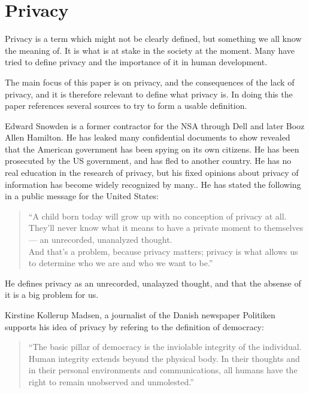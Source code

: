 \section{Privacy}
Privacy is a term which might not be clearly defined, but something we all know the meaning of. It is what is at stake in the society at the moment. Many have tried to define privacy and the importance of it in human development.

The main focus of this paper is on privacy, and the consequences of the lack of privacy, and it is therefore relevant to define what privacy is. In doing this the paper references several sources to try to form a usable definition.

Edward Snowden is a former contractor for the NSA through Dell and later Booz Allen Hamilton. He has leaked many confidential documents to show revealed that the American government has been spying on its own citizens. He has been prosecuted by the US government, and has fled to another country. He has no real education in the research of privacy, but his fixed opinions about privacy of information has become widely recognized by many.\cite{website:edward-snowden-basic}. He has stated the following in a public message for the United States:

\blockquote{``A child born today will grow up with no conception of privacy at all. They’ll never know what it means to have a private moment to themselves — an unrecorded, unanalyzed thought.\\ And that’s a problem, because privacy matters; privacy is what allows us to determine who we are and who we want to be.''\cite{interview:edward-snowden-christmas}}
He defines privacy as an unrecorded, unalayzed thought, and that the absense of it is a big problem for us.

Kirstine Kollerup Madsen, a journalist of the Danish newspaper Politiken supports his idea of privacy by refering to the definition of democracy:

\blockquote{``The basic pillar of democracy is the inviolable integrity of the individual. Human integrity extends beyond the physical body. In their thoughts and in their personal environments and communications, all humans have the right to remain unobserved and unmolested.''\cite{website:a-stand-for-democracy}}

